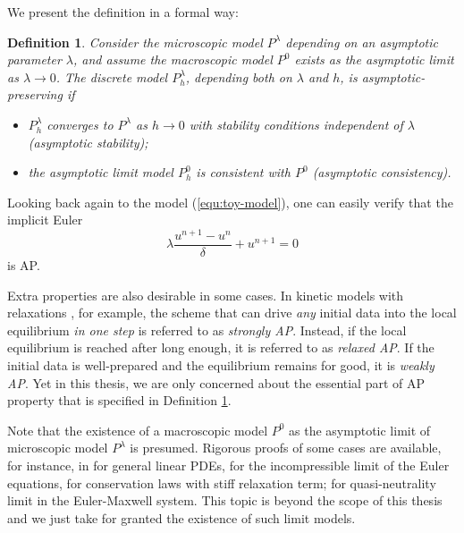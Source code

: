 \documentclass{report}
\newtheorem{definition}{Definition}
\begin{document}
 We present the definition in a formal way: 
 \begin{definition} \label{def:ap}
 Consider the microscopic model $P^\lambda$ depending on an asymptotic parameter $\lambda$, and assume the macroscopic model $P^0$ exists as the asymptotic limit as $\lambda \rightarrow 0$. The discrete model $P^\lambda_h$, depending both on $\lambda$ and $h$, is \emph{asymptotic-preserving} if
 \begin{itemize}
     \item $P^\lambda_h$ converges to $P^\lambda$ as $h\rightarrow0$ with stability conditions independent of $\lambda$ \emph{(asymptotic stability)};
     \item the asymptotic limit model $P^0_h$ is consistent with $P^0$ \emph{(asymptotic consistency)}.
 \end{itemize}
 \end{definition}
 Looking back again to the model (\ref{equ:toy-model}), one can easily verify that the implicit Euler
 \begin{equation*}
     \lambda\frac{u^{n+1}-u^{n}}{\delta} + u^{n+1} = 0
 \end{equation*}
 is AP. 
 
 Extra properties are also desirable in some cases. In kinetic models with relaxations \citep{jin_2010}, for example, the scheme that can drive \emph{any} initial data into the local equilibrium \emph{in one step} is referred to as \emph{strongly AP}. Instead, if the local equilibrium is reached after long enough, it is referred to as \emph{relaxed AP}. If the initial data is well-prepared and the equilibrium remains for good, it is \emph{weakly AP}. Yet in this thesis, we are only concerned about the essential part of AP property that is specified in Definition \ref{def:ap}.
 
 Note that the existence of a macroscopic model $P^0$ as the asymptotic limit of microscopic model $P^\lambda$ is presumed. Rigorous proofs of some cases are available, for instance, in \cite{friedman_1968} for general linear PDEs, \cite{klainerman_1981} for the incompressible limit of the Euler equations, \cite{chen_1994, natalini_1996} for conservation laws with stiff relaxation term; \cite{remi_2014} for quasi-neutrality limit in the Euler-Maxwell system. This topic is beyond the scope of this thesis and we just take for granted the existence of such limit models. 
 
\end{document}
